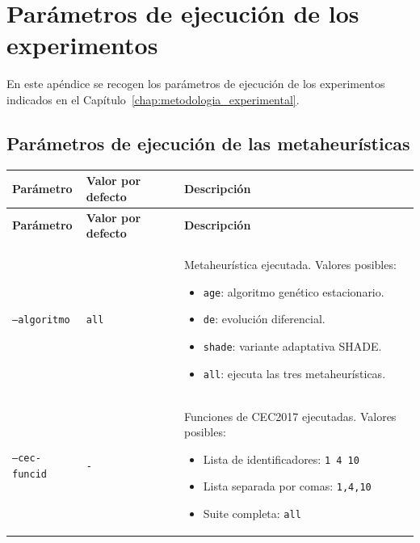 \chapter{Parámetros de ejecución de los experimentos}
\label{ap:parametros_experimentos}

En este apéndice se recogen los parámetros de ejecución de los experimentos indicados en el Capítulo~\ref{chap:metodologia_experimental}.

\section{Parámetros de ejecución de las metaheurísticas}

\clearpage
\begingroup
\setlength{\tabcolsep}{5pt}
\renewcommand{\arraystretch}{1.3}

\begin{longtable}[htbp]{|p{3.3cm}|p{2.8cm}|p{5.15cm}|}
    \hline
    \textbf{Parámetro} & \textbf{Valor por defecto}                                         & \textbf{Descripción} \\
    \hline
    \endfirsthead

    \hline
    \textbf{Parámetro} & \textbf{Valor por defecto}                                         & \textbf{Descripción} \\
    \hline
    \endhead

    \texttt{--algoritmo}
                       & \texttt{all}
                       & Metaheurística ejecutada. Valores posibles:
    \begin{itemize}
        \setlength{\itemsep}{0pt}
        \setlength{\topsep}{2pt}
        \item \texttt{age}: algoritmo genético estacionario.
        \item \texttt{de}: evolución diferencial.
        \item \texttt{shade}: variante adaptativa SHADE.
        \item \texttt{all}: ejecuta las tres metaheurísticas.
    \end{itemize}                                                           \\
    \hline

    \texttt{--cec-funcid}
                       & \texttt{-}
                       & Funciones de CEC2017 ejecutadas. Valores posibles:
    \begin{itemize}
        \setlength{\itemsep}{0pt}
        \setlength{\topsep}{2pt}
        \item Lista de identificadores: \texttt{1 4 10}
        \item Lista separada por comas: \texttt{1,4,10}
        \item Suite completa: \texttt{all}
    \end{itemize}                                                                 \\
    \hline


\end{longtable}
